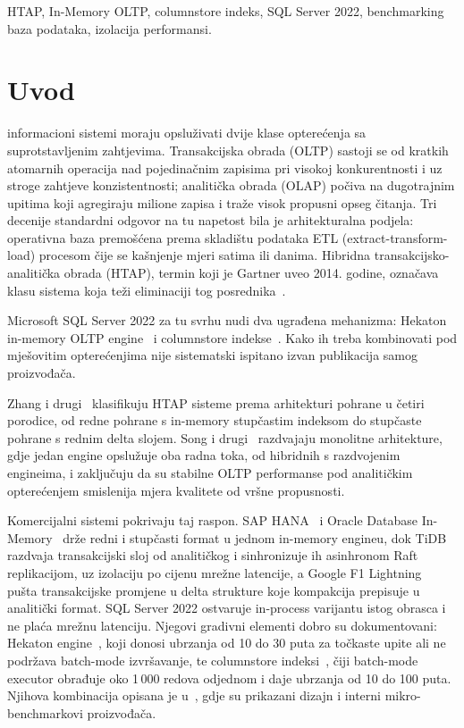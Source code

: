 \documentclass[10pt,conference,a4paper]{IEEEtran}
\begin{document}
\begin{IEEEkeywords}
HTAP, In-Memory OLTP, columnstore indeks, SQL Server 2022, benchmarking baza
podataka, izolacija performansi.
\end{IEEEkeywords}

\section{Uvod}
 informacioni sistemi moraju opsluživati dvije
klase opterećenja sa suprotstavljenim zahtjevima. Transakcijska obrada
(OLTP) sastoji se od kratkih atomarnih operacija nad pojedinačnim zapisima
pri visokoj konkurentnosti i uz stroge zahtjeve konzistentnosti; analitička
obrada (OLAP) počiva na dugotrajnim upitima koji agregiraju milione zapisa i
traže visok propusni opseg čitanja. Tri decenije standardni odgovor na tu
napetost bila je arhitekturalna podjela: operativna baza premošćena prema
skladištu podataka ETL (extract-transform-load) procesom čije se kašnjenje
mjeri satima ili danima.
Hibridna transakcijsko-analitička obrada (HTAP), termin koji je Gartner uveo
2014. godine, označava klasu sistema koja teži eliminaciji tog
posrednika~\cite{ozcan2017}.

Microsoft SQL Server 2022 za tu svrhu nudi dva ugrađena mehanizma: Hekaton
in-memory OLTP engine~\cite{diaconu2013} i columnstore
indekse~\cite{larson2013}. Kako ih treba kombinovati pod mješovitim
opterećenjima nije sistematski ispitano izvan publikacija samog proizvođača.

Zhang i drugi~\cite{zhang2024survey} klasifikuju HTAP sisteme prema
arhitekturi pohrane u četiri porodice, od redne pohrane s in-memory stupčastim
indeksom do stupčaste pohrane s rednim delta slojem.
Song i drugi~\cite{song2024} razdvajaju monolitne arhitekture, gdje jedan
engine opslužuje oba radna toka, od hibridnih s razdvojenim engineima, i
zaključuju da su stabilne OLTP performanse pod analitičkim opterećenjem
smislenija mjera kvalitete od vršne propusnosti.

Komercijalni sistemi pokrivaju taj raspon. SAP HANA~\cite{farber2012} i
Oracle Database In-Memory~\cite{lahiri2015} drže redni i stupčasti format u
jednom in-memory engineu, dok TiDB~\cite{huang2020} razdvaja transakcijski
sloj od analitičkog i sinhronizuje ih asinhronom Raft replikacijom, uz
izolaciju po cijenu mrežne latencije, a Google F1 Lightning~\cite{yang2020} pušta transakcijske
promjene u delta strukture koje kompakcija prepisuje u analitički format. SQL Server 2022 ostvaruje in-process varijantu istog obrasca i ne
plaća mrežnu latenciju. Njegovi gradivni elementi dobro su dokumentovani:
Hekaton engine~\cite{diaconu2013}, koji donosi ubrzanja od 10 do 30 puta za
točkaste upite ali ne podržava batch-mode izvršavanje, te columnstore
indeksi~\cite{larson2013}, čiji batch-mode executor obrađuje oko 1\,000
redova odjednom i daje ubrzanja od 10 do 100 puta. Njihova kombinacija
opisana je u~\cite{larson2015}, gdje su prikazani dizajn i interni
mikro-benchmarkovi proizvođača.
\end{document}
